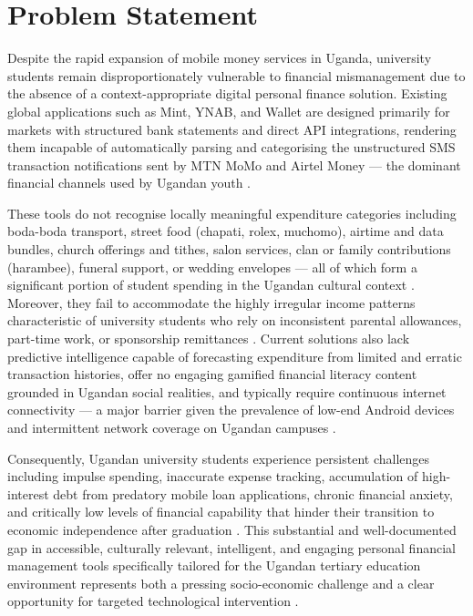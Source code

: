 \documentclass[12pt]{report}
\begin{document}
\section{Problem Statement}

Despite the rapid expansion of mobile money services in Uganda, university students
remain disproportionately vulnerable to financial mismanagement due to the absence of
a context-appropriate digital personal finance solution. Existing global applications
such as Mint, YNAB, and Wallet are designed primarily for markets with structured
bank statements and direct API integrations, rendering them incapable of automatically
parsing and categorising the unstructured SMS transaction notifications sent by MTN
MoMo and Airtel Money --- the dominant financial channels used by Ugandan youth
\citep{BOU2024}.

These tools do not recognise locally meaningful expenditure categories including
boda-boda transport, street food (chapati, rolex, muchomo), airtime and data bundles,
church offerings and tithes, salon services, clan or family contributions (harambee),
funeral support, or wedding envelopes --- all of which form a significant portion of
student spending in the Ugandan cultural context \citep{AmanaAndTamunomiegbam2024}.
Moreover, they fail to accommodate the highly irregular income patterns characteristic
of university students who rely on inconsistent parental allowances, part-time work, or
sponsorship remittances \citep{MoFPED2023}. Current solutions also lack predictive
intelligence capable of forecasting expenditure from limited and erratic transaction
histories, offer no engaging gamified financial literacy content grounded in Ugandan
social realities, and typically require continuous internet connectivity --- a major
barrier given the prevalence of low-end Android devices and intermittent network
coverage on Ugandan campuses \citep{UBOS2024}.

Consequently, Ugandan university students experience persistent challenges including
impulse spending, inaccurate expense tracking, accumulation of high-interest debt from
predatory mobile loan applications, chronic financial anxiety, and critically low levels
of financial capability that hinder their transition to economic independence after
graduation \citep{MoFPED2023,AmanaAndTamunomiegbam2024}. This substantial and
well-documented gap in accessible, culturally relevant, intelligent, and engaging
personal financial management tools specifically tailored for the Ugandan tertiary
education environment represents both a pressing socio-economic challenge and a clear
opportunity for targeted technological intervention \citep{Mursi2024,Imawan2025}.
\end{document}
